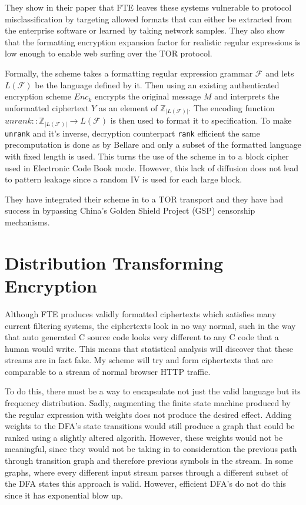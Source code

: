 \documentclass[10pt,a4paper]{article}
\begin{document}
They show in their paper that FTE leaves these systems vulnerable to protocol misclassification by targeting allowed formats that can either be extracted from the enterprise software or learned by taking network samples. They also show that the formatting encryption expansion factor for realistic regular expressions is low enough to enable web surfing over the TOR protocol.

Formally, the scheme takes a formatting regular expression grammar $\mathcal{F}$ and lets $L(\mathcal{F})$ be the language defined by it. Then using an existing authenticated encryption scheme $Enc_k$ encrypts the original message $M$ and interprets the unformatted ciphertext $Y$ as an element of $\mathbb{Z}_{\vert L(\mathcal{F}) \vert}$. The encoding function $unrank :: \mathbb{Z}_{\vert L(\mathcal{F}) \vert} \rightarrow L(\mathcal{F})$ is then used to format it to specification. To make \texttt{unrank} and it's inverse, decryption counterpart \texttt{rank} efficient the same precomputation is done as by Bellare and only a subset of the formatted language with fixed length is used. This turns the use of the scheme in to a block cipher used in Electronic Code Book mode. However, this lack of diffusion does not lead to pattern leakage since a random IV is used for each large block.

They have integrated their scheme in to a TOR transport and they have had success in bypassing China's Golden Shield Project (GSP) censorship mechanisms.



\pagebreak
\section{Distribution Transforming Encryption}

Although FTE produces validly formatted ciphertexts which satisfies many current filtering systems, the ciphertexts look in no way normal, such in the way that auto generated C source code looks very different to any C code that a human would write. This means that statistical analysis will discover that these streams are in fact fake. My scheme will try and form ciphertexts that are comparable to a stream of normal browser HTTP traffic.

To do this, there must be a way to encapsulate not just the valid language but its frequency distribution. Sadly, augmenting the finite state machine produced by the regular expression with weights does not produce the desired effect. Adding weights to the DFA's state transitions would still produce a graph that could be ranked using a slightly altered algorith. However, these weights would not be meaningful, since they would not be taking in to consideration the previous path through transition graph and therefore previous symbols in the stream. In some graphs, where every different input stream parses through a different subset of the DFA states this approach is valid. However, efficient DFA's do not do this since it has exponential blow up.
\end{document}
